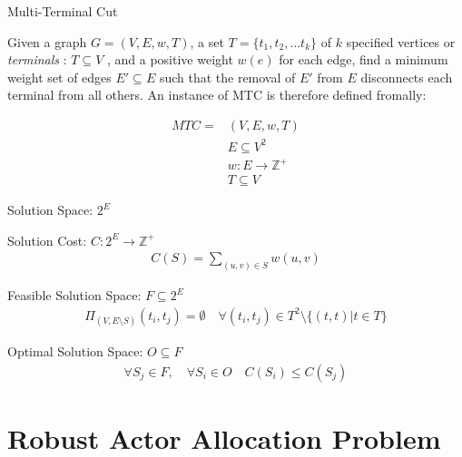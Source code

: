 \documentclass{article}
\begin{document}
\begin{definition}
Multi-Terminal Cut

Given a graph $G=(V,E,w,T)$, a set $T=\{t_1, t_2, ... t_k\}$ of $k$ specified vertices or {\em terminals} : $T \subseteq V$ , and a positive weight $w(e)$ for each edge, find a minimum weight set of edges $E' \subseteq E$ such that the removal of $E'$ from $E$ disconnects each terminal from all others.
An instance of MTC is therefore defined fromally:

\begin{align}
	\nonumber MTC = & (V,E,w,T)\\
	\nonumber & E \subseteq V^2\\
	\nonumber & w : E \rightarrow \mathbb{Z}^+\\
	\nonumber & T \subseteq V
\end{align}

Solution Space: $2^E$

Solution Cost: $C : 2^E \rightarrow \mathbb{Z}^+$
\begin{align}
	\nonumber C(S) = \displaystyle\sum\limits_{(u,v) \in S} w(u,v)
\end{align}

Feasible Solution Space: $F \subseteq 2^E$
\begin{align}
	\nonumber \Pi_{(V,E \setminus S)}(t_i, t_j) = \emptyset \quad \forall (t_i, t_j) \in T^2 \setminus \{(t, t) | t \in T\}
\end{align}

Optimal Solution Space: $O \subseteq F$
\begin{align}
	\forall S_j \in F , \quad \forall S_i \in O \quad \nonumber C(S_i) \leq C(S_j)
\end{align}

\end{definition}


\section{Robust Actor Allocation Problem}
\end{document}
